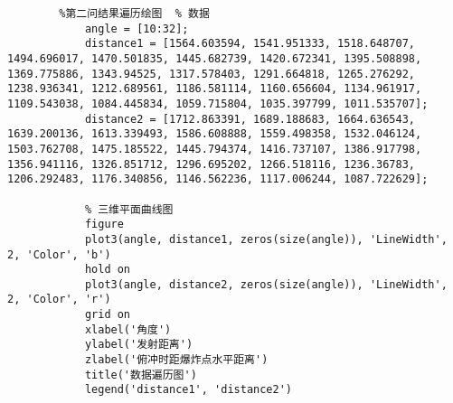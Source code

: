 \documentclass[normalsize]{ctexart}
\begin{document}
		\begin{lstlisting}
		%第二问结果遍历绘图	% 数据
			angle = [10:32];
			distance1 = [1564.603594, 1541.951333, 1518.648707, 1494.696017, 1470.501835, 1445.682739, 1420.672341, 1395.508898, 1369.775886, 1343.94525, 1317.578403, 1291.664818, 1265.276292, 1238.936341, 1212.689561, 1186.581114, 1160.656604, 1134.961917, 1109.543038, 1084.445834, 1059.715804, 1035.397799, 1011.535707];
			distance2 = [1712.863391, 1689.188683, 1664.636543, 1639.200136, 1613.339493, 1586.608888, 1559.498358, 1532.046124, 1503.762708, 1475.185522, 1445.794374, 1416.737107, 1386.917798, 1356.941116, 1326.851712, 1296.695202, 1266.518116, 1236.36783, 1206.292483, 1176.340856, 1146.562236, 1117.006244, 1087.722629];
			
			% 三维平面曲线图
			figure
			plot3(angle, distance1, zeros(size(angle)), 'LineWidth', 2, 'Color', 'b')
			hold on
			plot3(angle, distance2, zeros(size(angle)), 'LineWidth', 2, 'Color', 'r')
			grid on
			xlabel('角度')
			ylabel('发射距离')
			zlabel('俯冲时距爆炸点水平距离')
			title('数据遍历图')
			legend('distance1', 'distance2')
			

\end{lstlisting}
\end{document}
